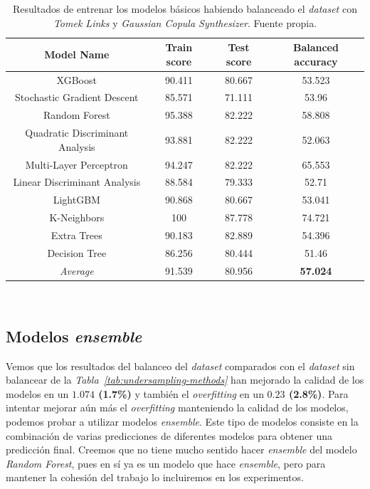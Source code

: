 \begin{table}[!h]
    \centering
    \begin{tabular}{|c|ccc|}\hline
        Model Name & Train score & Test score & Balanced accuracy \\ \hline
        XGBoost & 90.411 & 80.667 & 53.523 \\
        Stochastic Gradient Descent & 85.571 & 71.111 & 53.96 \\
        Random Forest & 95.388 & 82.222 & 58.808 \\
        Quadratic Discriminant Analysis & 93.881 & 82.222 & 52.063 \\
        Multi-Layer Perceptron & 94.247 & 82.222 & 65.553 \\
        Linear Discriminant Analysis & 88.584 & 79.333 & 52.71 \\
        LightGBM & 90.868 & 80.667 & 53.041 \\
        K-Neighbors & 100 & 87.778 & 74.721 \\
        Extra Trees & 90.183 & 82.889 & 54.396 \\
        Decision Tree & 86.256 & 80.444 & 51.46 \\ \hline
        \textit{Average} & 91.539 & 80.956 & \textbf{57.024} \\ \hline
    \end{tabular}
    \caption{Resultados de entrenar los modelos básicos habiendo balanceado el \textit{dataset} con \textit{Tomek Links} y \textit{Gaussian Copula Synthesizer}. Fuente propia.}\ \label{tab:balanced-basic-training}
\end{table}

\subsection{Modelos \textit{ensemble}}

Vemos que los resultados del balanceo del \textit{dataset} comparados con el \textit{dataset} sin balancear de la \textit{Tabla\ \ref{tab:undersampling-methods}} han mejorado la calidad de los modelos en un \textbf{$1.074$ (1.7\%)} y también el \textit{overfitting} en un \textbf{$0.23$ (2.8\%)}. Para intentar mejorar aún más el \textit{overfitting} manteniendo la calidad de los modelos, podemos probar a utilizar modelos \textit{ensemble}. Este tipo de modelos consiste en la combinación de varias predicciones de diferentes modelos para obtener una predicción final. Creemos que no tiene mucho sentido hacer \textit{ensemble} del modelo \textit{Random Forest}, pues en sí ya es un modelo que hace \textit{ensemble}, pero para mantener la cohesión del trabajo lo incluiremos en los experimentos.

